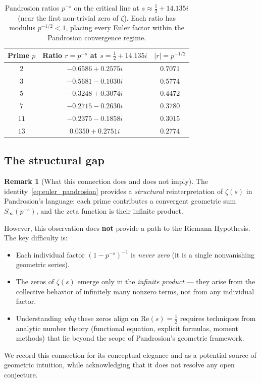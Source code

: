 \documentclass[11pt,a4paper]{article}
\theoremstyle{definition}
\newtheorem{remark}{Remark}[section]
\begin{document}
\begin{table}[h]
\centering
\begin{tabular}{ccc}
\toprule
Prime $p$ & Ratio $r = p^{-s}$ at $s = \tfrac{1}{2} + 14.135i$ & $|r| = p^{-1/2}$ \\
\midrule
$2$ & $-0.6586 + 0.2575i$ & $0.7071$ \\
$3$ & $-0.5681 - 0.1030i$ & $0.5774$ \\
$5$ & $-0.3248 + 0.3074i$ & $0.4472$ \\
$7$ & $-0.2715 - 0.2630i$ & $0.3780$ \\
$11$ & $-0.2375 - 0.1858i$ & $0.3015$ \\
$13$ & $0.0350 + 0.2751i$ & $0.2774$ \\
\bottomrule
\end{tabular}
\caption{Pandrosion ratios $p^{-s}$ on the critical line at $s \approx \tfrac{1}{2} + 14.135i$ (near the first non-trivial zero of $\zeta$).  Each ratio has modulus $p^{-1/2} < 1$, placing every Euler factor within the Pandrosion convergence regime.}
\label{tab:critical_ratios}
\end{table}

\subsection{The structural gap}

\begin{remark}[What this connection does and does not imply]
\label{rem:honest}
The identity~\eqref{eq:euler_pandrosion} provides a \emph{structural} reinterpretation of $\zeta(s)$ in Pandrosion's language: each prime contributes a convergent geometric sum $S_\infty(p^{-s})$, and the zeta function is their infinite product.

However, this observation does \textbf{not} provide a path to the Riemann Hypothesis.  The key difficulty is:
\begin{itemize}
  \item Each individual factor $(1 - p^{-s})^{-1}$ is \emph{never zero} (it is a single nonvanishing geometric series).
  \item The zeros of $\zeta(s)$ emerge only in the \emph{infinite product} --- they arise from the collective behavior of infinitely many nonzero terms, not from any individual factor.
  \item Understanding \emph{why} these zeros align on $\mathrm{Re}(s) = \tfrac{1}{2}$ requires techniques from analytic number theory (functional equation, explicit formulas, moment methods) that lie beyond the scope of Pandrosion's geometric framework.
\end{itemize}
We record this connection for its conceptual elegance and as a potential source of geometric intuition, while acknowledging that it does not resolve any open conjecture.
\end{remark}
\end{document}
